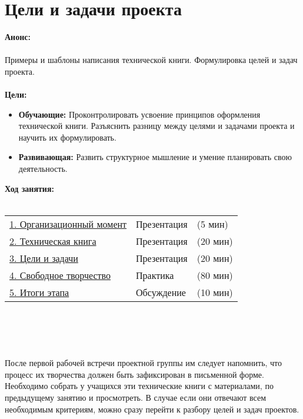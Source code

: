 \chapter{Цели и задачи проекта}
{\bfseries Анонс:}\\\\
Примеры и шаблоны написания технической книги. Формулировка целей и задач проекта.\\\\
{\bfseries Цели:}
\begin{itemize}
	\item{}{\bfseries Обучающие:} Проконтролировать усвоение принципов оформления технической книги. Разъяснить разницу между целями и задачами проекта и научить их формулировать. 
	\item{}{\bfseries Развивающая:} Развить структурное мышление и умение планировать свою деятельность.\\
\end{itemize}	
{\bfseries Ход занятия:}\\\\
\begin{tabular}[h!]{lll}
	{\hyperlink{lesson24x1}{1. Организационный момент}}&{Презентация}&{(5 мин)}\\
	{\hyperlink{lesson24x2}{2. Техническая книга}}&{Презентация}&{(20 мин)}\\
	{\hyperlink{lesson24x3}{3. Цели и задачи}}&{Презентация}&{(20 мин)}\\
	{\hyperlink{lesson24x4}{4. Свободное творчество}}&{Практика}&{(80 мин)}\\
	{\hyperlink{lesson24x5}{5. Итоги этапа}}&{Обсуждение}&{(10 мин)}\\
\end{tabular}\\\\

{\hypertarget{lesson24x1}{}}\\\\

После первой рабочей встречи проектной группы им следует напомнить, что процесс их творчества должен быть зафиксирован в письменной форме. Необходимо собрать у учащихся эти технические книги с материалами, по предыдущему занятию и просмотреть. В случае если они отвечают всем необходимым критериям, можно сразу перейти к разбору целей и задач проектов.\\\\

{\hypertarget{lesson24x2}{}}\\\\

